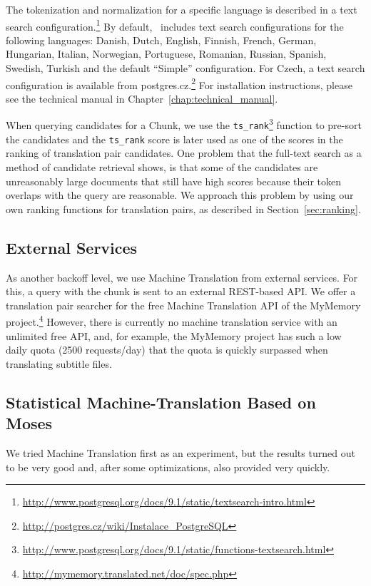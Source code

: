 The tokenization and normalization for a specific language is described in a text search configuration.\footnote{\url{http://www.postgresql.org/docs/9.1/static/textsearch-intro.html}} By default, \postgres~includes text search configurations for the following languages: Danish, Dutch, English, Finnish, French, German, Hungarian, Italian, Norwegian, Portuguese, Romanian, Russian, Spanish, Swedish, Turkish and the default ``Simple'' configuration. For Czech, a text search configuration is available from postgres.cz.\footnote{\url{http://postgres.cz/wiki/Instalace_PostgreSQL}} For installation instructions, please see the technical manual in Chapter~\ref{chap:technical_manual}.

When querying candidates for a Chunk, we use the {\tt ts\_rank}\footnote{\url{http://www.postgresql.org/docs/9.1/static/functions-textsearch.html}} function to pre-sort the candidates and the {\tt ts\_rank} score is later used as one of the scores in the ranking of translation pair candidates. One problem that the full-text search as a method of candidate retrieval shows, is that some of the candidates are unreasonably large documents that still have high scores because their token overlaps with the query are reasonable. We approach this problem by using our own ranking functions for translation pairs, as described in Section~\ref{sec:ranking}.


\subsection{External Services}

As another backoff level, we use Machine Translation from external services.
For this, a query with the chunk is sent to an external REST-based API. We offer a translation pair searcher for the free Machine Translation API of the MyMemory project.\footnote{ \url{http://mymemory.translated.net/doc/spec.php}} However, there is currently no machine translation service with an unlimited free API, and, for example, the MyMemory project has such a low daily quota (2500 requests/day) that the quota is quickly surpassed when translating subtitle files.

\subsection{Statistical Machine-Translation Based on Moses}
\label{sec:statmtmoses}

We tried Machine Translation first as an experiment, but the results turned out to be very good and, after some optimizations, also provided very quickly.

